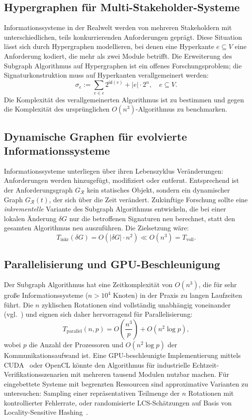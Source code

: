 ﻿\documentclass[a4paper,12pt]{report}
\theoremstyle{definition}
\begin{document}
\subsection{Hypergraphen für Multi-Stakeholder-Systeme}

Informationssysteme in der Realwelt werden von mehreren Stakeholdern mit
unterschiedlichen, teils konkurrierenden Anforderungen geprägt. Diese Situation
lässt sich durch Hypergraphen modellieren, bei denen eine Hyperkante
$e \subseteq V$ eine Anforderung kodiert, die mehr als zwei Module betrifft.
Die Erweiterung des Subgraph Algorithmus auf Hypergraphen ist ein offenes
Forschungsproblem; die Signaturkonstruktion muss auf Hyperkanten verallgemeinert
werden:
\[
  \sigma_e := \sum_{v \in e} 2^{\mathsf{id}(v)} + |e| \cdot 2^n, \quad e \subseteq V.
\]
Die Komplexität des verallgemeinerten Algorithmus ist zu bestimmen und gegen die
Komplexität des ursprünglichen $O(n^3)$-Algorithmus zu benchmarken.

\subsection{Dynamische Graphen für evolvierte Informationssysteme}

Informationssysteme unterliegen über ihren Lebenszyklus Veränderungen: Anforderungen
werden hinzugefügt, modifiziert oder entfernt. Entsprechend ist der Anforderungsgraph
$G_\mathcal{R}$ kein statisches Objekt, sondern ein dynamischer Graph
$G_\mathcal{R}(t)$, der sich über die Zeit verändert. Zukünftige Forschung sollte
eine \emph{inkrementelle} Variante des Subgraph Algorithmus entwickeln, die bei einer
lokalen Änderung $\delta G$ nur die betroffenen Signaturen neu berechnet, statt den
gesamten Algorithmus neu auszuführen. Die Zielsetzung wäre:
\[
  T_{\text{inkr}}(\delta G) = O(|\delta G| \cdot n^2) \ll O(n^3) = T_{\text{voll}}.
\]

\subsection{Parallelisierung und GPU-Beschleunigung}

Der Subgraph Algorithmus hat eine Zeitkomplexität von $O(n^3)$, die für sehr große
Informationssysteme ($n > 10^4$ Knoten) in der Praxis zu langen Laufzeiten führt.
Die $n$ zyklischen Rotationen sind vollständig unabhängig voneinander
(vgl.~\cite{subgraph2026}) und eignen sich daher hervorragend für Parallelisierung:
\[
  T_{\text{parallel}}(n, p) = O\!\left(\frac{n^3}{p}\right) + O(n^2 \log p),
\]
wobei $p$ die Anzahl der Prozessoren und $O(n^2 \log p)$ der Kommunikationsaufwand ist.
Eine GPU-beschleunigte Implementierung mittels CUDA~\cite{cuda2023} oder OpenCL könnte
den Algorithmus für industrielle Echtzeit-Verifikationsszenarien mit mehreren tausend
Modulen nutzbar machen. Für eingebettete Systeme mit begrenzten Ressourcen sind
approximative Varianten zu untersuchen: Sampling einer repräsentativen Teilmenge der
$n$ Rotationen mit kontrollierter Fehlerrate, oder randomisierte LCS-Schätzungen
auf Basis von Locality-Sensitive Hashing~\cite{indyk1998}.
\end{document}
